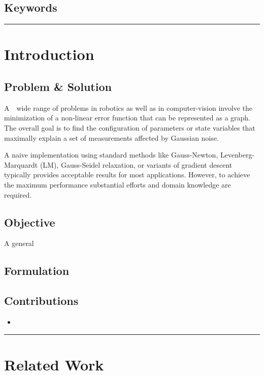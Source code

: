 \documentclass[letterpaper,10pt]{article}
\begin{document}
\subsection{Keywords}


\begin{center}\rule{\textwidth}{1pt}\end{center}
\section{Introduction}

\subsection{Problem \& Solution}
A　wide range of problems in robotics as well as in computer-vision involve the minimization of a non-linear error function that can be represented as a graph. The overall goal is to find the configuration of parameters or state variables that maximally explain a set of measurements affected by Gaussian noise.

A naive implementation using standard methods like Gauss-Newton, Levenberg-Marquardt (LM), Gauss-Seidel relaxation, or variants of gradient descent typically provides acceptable results for most applications. However, to achieve the maximum performance substantial efforts and domain  knowledge are required.

\subsection{Objective}
A general

\subsection{Formulation}


\subsection{Contributions}
\begin{itemize}
	\item 
\end{itemize}

\begin{center}\rule{\textwidth}{1pt}\end{center}
\section{Related Work}
\end{document}
